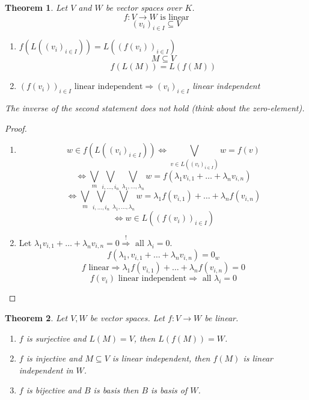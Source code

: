 \documentclass[a4paper,landscape,twocolumn]{article}
\newtheorem{theorem}{Theorem}
\begin{document}
\begin{theorem}
  \label{satz-5.12}
  Let $V$ and $W$ be vector spaces over $K$.
  \[ f: V \rightarrow W \text{ is linear} \]
  \[ (v_i)_{i \in I} \subseteq V \]
  \begin{enumerate}
    \item $f(L((v_i)_{i\in I})) = L((f(v_i))_{i \in I})$
      \[ M \subseteq V \]
      \[ f(L(M)) = L(f(M)) \]
    \item $\left(f(v_i)\right)_{i \in I} \text{ linear independent} \Rightarrow (v_i)_{i \in I}$ linear independent
  \end{enumerate}
  The inverse of the second statement does not hold (think about the zero-element).
\end{theorem}
\begin{proof}
  \begin{enumerate}
    \item
      \[ w \in f(L((v_i)_{i \in I})) \Leftrightarrow \bigvee_{v \in L((v_i)_{i \in I})} w = f(v) \]
      \[ \Leftrightarrow \bigvee_{m} \bigvee_{i, \dots, i_n} \bigvee_{\lambda_1, \dots, \lambda_n} w = f(\lambda_1 v_{i,1} + \dots + \lambda_n v_{i,n}) \]
      \[ \Leftrightarrow \bigvee_{m} \bigvee_{i, \dots, i_n} \bigvee_{\lambda_1, \dots, \lambda_n} w = \lambda_1 f(v_{i,1}) + \dots + \lambda_n f(v_{i,n}) \]
      \[ \Leftrightarrow w \in L((f(v_i))_{i \in I}) \]
    \item
      Let $\lambda_1 v_{i,1} + \dots + \lambda_n v_{i,n} = 0 \stackrel{!}{\Rightarrow} \text{ all } \lambda_i = 0$.
      \[ f(\lambda_1, v_{i,1} + \dots + \lambda_n v_{i,n}) = 0_w \]
      \[ f \text{ linear} \Rightarrow \lambda_1 f(v_{i,1}) + \dots + \lambda_n f(v_{i,n}) = 0 \]
      \[ f(v_i) \text{ linear independent} \Rightarrow \text{ all } \lambda_i = 0 \]
  \end{enumerate}
\end{proof}

\begin{theorem}
  \label{satz-5-13}
  Let $V, W$ be vector spaces. Let $f: V \rightarrow W$ be linear.
  \begin{enumerate}
    \item $f$ is surjective and $L(M) = V$, then $L(f(M)) = W$.
    \item $f$ is injective and $M \subseteq V$ is linear independent, then $f(M)$ is linear independent in $W$.
    \item $f$ is bijective and $B$ is basis then $B$ is basis of $W$.
  \end{enumerate}
\end{theorem}
\end{document}
